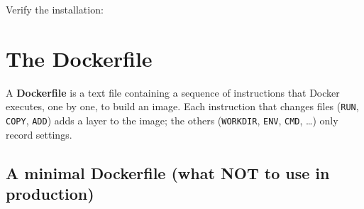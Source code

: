 \noindent{}Verify the installation:

\begin{codebox}[short]

\begin{Shaded}
\begin{Highlighting}[]
 

\end{Highlighting}
\end{Shaded}

\end{codebox}

\setcounter{section}{2}
\section{The Dockerfile}\label{18-containerization:183-the-dockerfile}

A \textbf{Dockerfile} is a text file containing a sequence of instructions that Docker executes, one by one, to build an image. Each instruction that changes files (\texttt{RUN}, \texttt{COPY}, \texttt{ADD}) adds a layer to the image; the others (\texttt{WORKDIR}, \texttt{ENV}, \texttt{CMD}, \ldots) only record settings.

\subsection*{A minimal Dockerfile (what NOT to use in production)}\label{18-containerization:a-minimal-dockerfile-what-not-to-use-in-production}

\begin{codebox}[short]

\begin{Shaded}
\begin{Highlighting}[]
 
\NormalTok{ [}\NormalTok{, }\NormalTok{]}
\end{Highlighting}
\end{Shaded}

\end{codebox}

